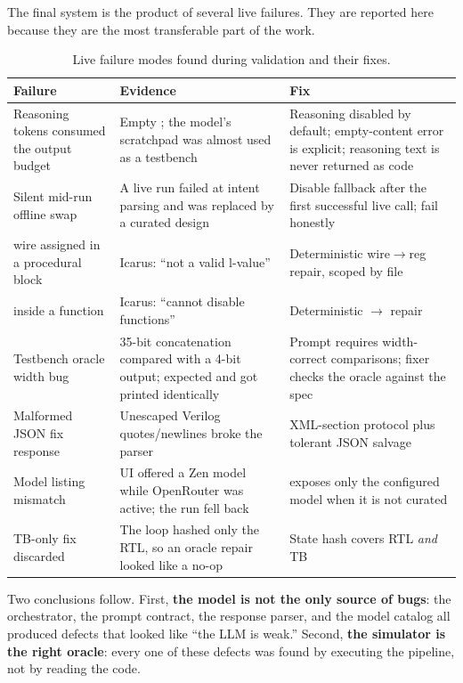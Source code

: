 \documentclass[11pt,a4paper]{article}
\newcommand{\code}[1]{\texttt{\detokenize{#1}}}
\begin{document}
The final system is the product of several live failures. They are reported here
because they are the most transferable part of the work.

\begin{table}[H]
\centering
\caption{Live failure modes found during validation and their fixes.}
\label{tab:failures}
\footnotesize
\begin{tabularx}{\textwidth}{@{}p{3.9cm}p{5.3cm}X@{}}
\toprule
\textbf{Failure} & \textbf{Evidence} & \textbf{Fix} \\
\midrule
Reasoning tokens consumed the output budget & Empty \code{content}; the model's scratchpad was almost used as a testbench & Reasoning disabled by default; empty-content error is explicit; reasoning text is never returned as code \\
Silent mid-run offline swap & A live run failed at intent parsing and was replaced by a curated design & Disable fallback after the first successful live call; fail honestly \\
wire assigned in a procedural block & Icarus: ``not a valid l-value'' & Deterministic wire$\rightarrow$reg repair, scoped by file \\
\code{disable} inside a function & Icarus: ``cannot disable functions'' & Deterministic \code{disable}$\rightarrow$\code{return} repair \\
Testbench oracle width bug & 35-bit concatenation compared with a 4-bit output; expected and got printed identically & Prompt requires width-correct comparisons; fixer checks the oracle against the spec \\
Malformed JSON fix response & Unescaped Verilog quotes/newlines broke the parser & XML-section protocol plus tolerant JSON salvage \\
Model listing mismatch & UI offered a Zen model while OpenRouter was active; the run fell back & \code{/api/models} exposes only the configured model when it is not curated \\
TB-only fix discarded & The loop hashed only the RTL, so an oracle repair looked like a no-op & State hash covers RTL \emph{and} TB \\
\bottomrule
\end{tabularx}
\end{table}

Two conclusions follow. First, \textbf{the model is not the only source of bugs}:
the orchestrator, the prompt contract, the response parser, and the model catalog
all produced defects that looked like ``the LLM is weak.'' Second, \textbf{the
simulator is the right oracle}: every one of these defects was found by executing
the pipeline, not by reading the code.
\end{document}
